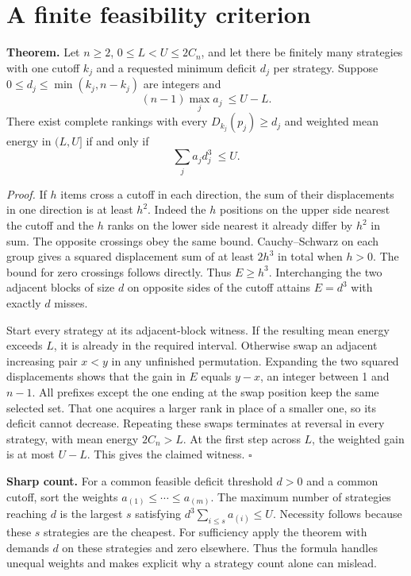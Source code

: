 \documentclass[11pt]{article}
\begin{document}
\section{A finite feasibility criterion}
\textbf{Theorem.} Let $n\ge2$, $0\le L<U\le 2C_n$, and let there be finitely many strategies with one cutoff $k_j$ and a requested minimum deficit $d_j$ per strategy. Suppose $0\le d_j\le\min(k_j,n-k_j)$ are integers and
\[
 (n-1)\max_j a_j\ \le U-L .
\]
There exist complete rankings with every $D_{k_j}(p_j)\ge d_j$ and weighted mean energy in $(L,U]$ if and only if
\[
                       \sum_j a_j d_j^3\ \le U .
\]

\textit{Proof.} If $h$ items cross a cutoff in each direction, the sum of their displacements in one direction is at least $h^2$. Indeed the $h$ positions on the upper side nearest the cutoff and the $h$ ranks on the lower side nearest it already differ by $h^2$ in sum. The opposite crossings obey the same bound. Cauchy--Schwarz on each group gives a squared displacement sum of at least $2h^3$ in total when $h>0$. The bound for zero crossings follows directly. Thus $E\ge h^3$. Interchanging the two adjacent blocks of size $d$ on opposite sides of the cutoff attains $E=d^3$ with exactly $d$ misses.

Start every strategy at its adjacent-block witness. If the resulting mean energy exceeds $L$, it is already in the required interval. Otherwise swap an adjacent increasing pair $x<y$ in any unfinished permutation. Expanding the two squared displacements shows that the gain in $E$ equals $y-x$, an integer between 1 and $n-1$. All prefixes except the one ending at the swap position keep the same selected set. That one acquires a larger rank in place of a smaller one, so its deficit cannot decrease. Repeating these swaps terminates at reversal in every strategy, with mean energy $2C_n>L$. At the first step across $L$, the weighted gain is at most $U-L$. This gives the claimed witness. \hfill$\square$

\textbf{Sharp count.} For a common feasible deficit threshold $d>0$ and a common cutoff, sort the weights $a_{(1)}\le\cdots\le a_{(m)}$. The maximum number of strategies reaching $d$ is the largest $s$ satisfying $d^3\sum_{i\le s}a_{(i)}\le U$. Necessity follows because these $s$ strategies are the cheapest. For sufficiency apply the theorem with demands $d$ on these strategies and zero elsewhere. Thus the formula handles unequal weights and makes explicit why a strategy count alone can mislead.
\newpage
\end{document}

